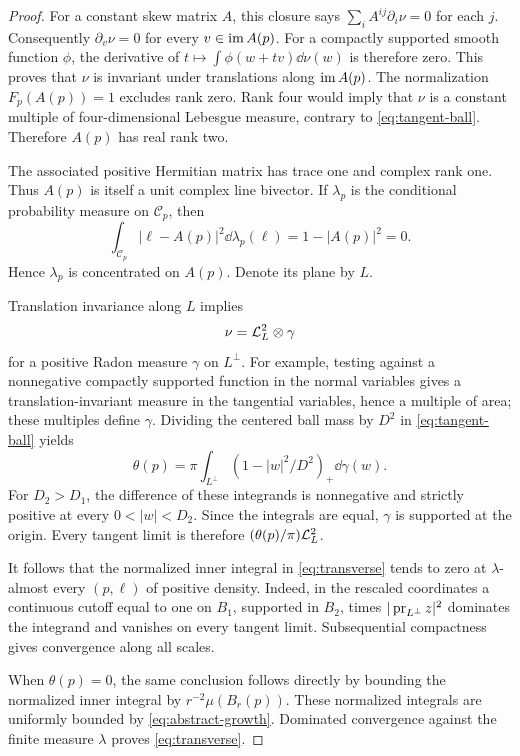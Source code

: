 \begin{proof}
For a constant skew matrix \(A\), this closure says
\(\sum_i A^{ij}\partial_i\nu=0\) for each \(j\).
Consequently \(\partial_v\nu=0\) for every \(v\in\operatorname{im} A(p)\).
For a compactly supported smooth function \(\phi\), the derivative
of \(t\mapsto\int\phi(w+tv)\dd\nu(w)\) is therefore zero.
This proves that \(\nu\) is invariant under translations along
\(\operatorname{im} A(p)\). The normalization \(F_p(A(p))=1\) excludes
rank zero. Rank four would imply that \(\nu\) is a
constant multiple of four-dimensional Lebesgue measure,
contrary to \eqref{eq:tangent-ball}.
Therefore \(A(p)\) has real rank two.

The associated positive Hermitian matrix has trace one
and complex rank one. Thus \(A(p)\) is itself a unit
complex line bivector. If \(\lambda_p\) is the conditional
probability measure on \(\mathscr C_p\), then
\[
\int_{\mathscr C_p}|\ell-A(p)|^2\dd\lambda_p(\ell)
=1-|A(p)|^2=0.
\]
Hence \(\lambda_p\) is concentrated on \(A(p)\).
Denote its plane by \(L\).

Translation invariance along \(L\) implies
\[
\nu=\mathcal L^2_L\otimes\gamma
\]
for a positive Radon measure \(\gamma\) on \(L^\perp\).
For example, testing against a nonnegative compactly
supported function in the normal variables gives a
translation-invariant measure in the tangential variables,
hence a multiple of area; these multiples define \(\gamma\).
Dividing the centered ball mass by \(D^2\) in
\eqref{eq:tangent-ball} yields
\begin{equation}\label{eq:transverse-product}
\theta(p)=\pi\int_{L^\perp}(1-|w|^2/D^2)_+\dd\gamma(w).
\end{equation}
For \(D_2>D_1\), the difference of these integrands is
nonnegative and strictly positive at every
\(0<|w|<D_2\). Since the integrals are equal, \(\gamma\)
is supported at the origin. Every tangent limit is
therefore \((\theta(p)/\pi)\mathcal L^2_L\).

It follows that the normalized inner integral in
\eqref{eq:transverse} tends to zero at
\(\lambda\)-almost every \((p,\ell)\) of positive density.
Indeed, in the rescaled coordinates a continuous cutoff
equal to one on \(B_1\), supported in \(B_2\), times
\(|\operatorname{pr}_{L^\perp}z|^2\) dominates the integrand and
vanishes on every tangent limit. Subsequential compactness
gives convergence along all scales.

When \(\theta(p)=0\), the same conclusion follows directly
by bounding the normalized inner integral by
\(r^{-2}\mu(B_r(p))\). These normalized integrals are
uniformly bounded by \eqref{eq:abstract-growth}.
Dominated convergence against the finite measure
\(\lambda\) proves \eqref{eq:transverse}.
\end{proof}
